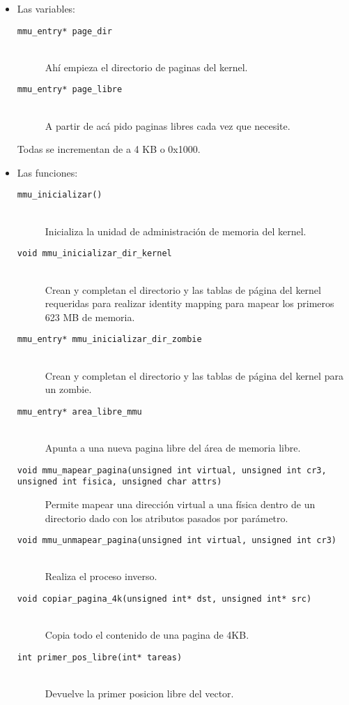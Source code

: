 \documentclass[a4paper]{article}
\begin{document}
\begin{itemize}
\item{Las variables:}

\begin{description}
	\item[\texttt{mmu_entry* page_dir}] \hfill \\
	Ahí empieza el directorio de paginas del kernel.
	\item[\texttt{mmu_entry* page_libre}] \hfill \\
	A partir de acá pido paginas libres cada vez que necesite.
	

\end{description}
Todas se incrementan de a 4 KB o 0x1000.

\item{Las funciones:}
\begin{description}
	\item[\texttt{mmu_inicializar()}] \hfill \\
	Inicializa la unidad de administración de memoria del kernel.
	
	\item[\texttt{void mmu_inicializar_dir_kernel}] \hfill \\
	Crean y completan el directorio y las tablas de página del kernel requeridas para realizar identity mapping para mapear los primeros 623 MB de memoria. 
	
	\item[\texttt{mmu_entry* mmu_inicializar_dir_zombie}] \hfill \\
	Crean y completan el directorio y las tablas de página del kernel para un zombie.
	
	\item[\texttt{mmu_entry* area_libre_mmu}] \hfill \\
	 Apunta a una nueva pagina libre del área de memoria libre.
	
	\item[\texttt{void mmu_mapear_pagina(unsigned int virtual, unsigned int cr3, unsigned int fisica, unsigned char attrs)}]
	Permite mapear una dirección virtual a una física dentro de un directorio dado con los atributos pasados por parámetro.
	
	\item[\texttt{void mmu_unmapear_pagina(unsigned int virtual, unsigned int cr3)}] \hfill \\
	Realiza el proceso inverso.	
	
	\item[\texttt{void copiar_pagina_4k(unsigned int* dst, unsigned int* src)}] \hfill \\
	Copia todo el contenido de una pagina de 4KB.		

	\item[\texttt{int primer_pos_libre(int* tareas)}] \hfill \\
	Devuelve la primer posicion libre del vector.	
	
\end{description}
\end{itemize}
\end{document}
